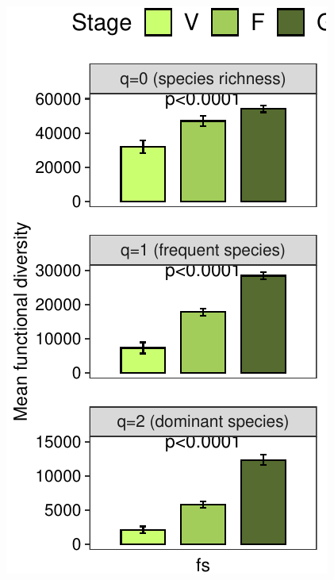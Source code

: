 \documentclass[]{interact}
\theoremstyle{plain}%
\theoremstyle{definition}
\theoremstyle{remark}
\begin{document}
\begin{center}\includegraphics{Doc_pdf_files/figure-latex/unnamed-chunk-33-1} \end{center}
\end{document}
